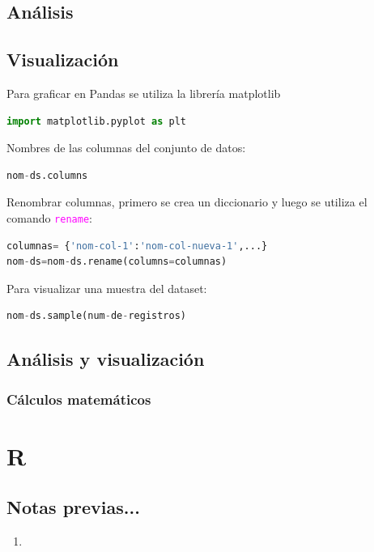 \documentclass[a4paper, 12pt]{book}
\begin{document}
\section{Análisis}

\section{Visualización}
Para graficar en Pandas se utiliza la librería matplotlib
\begin{lstlisting}[language=Python]
import matplotlib.pyplot as plt
\end{lstlisting}




Nombres de las columnas del conjunto de datos:
\begin{lstlisting}[language=Python]
nom-ds.columns
\end{lstlisting}

Renombrar columnas, primero se crea un diccionario y luego se utiliza el comando \texttt{\textcolor{magenta}{rename}}:
\begin{lstlisting}[language=Python]
columnas= {'nom-col-1':'nom-col-nueva-1',...}
nom-ds=nom-ds.rename(columns=columnas)
\end{lstlisting}

Para visualizar una muestra del dataset:
\begin{lstlisting}[language=Python]
nom-ds.sample(num-de-registros)
\end{lstlisting}



\section{Análisis y visualización}
\subsection{Cálculos matemáticos}


%
\chapter{R}
\section{Notas previas...}
\begin{enumerate}
\item 
\end{enumerate}
\end{document}
